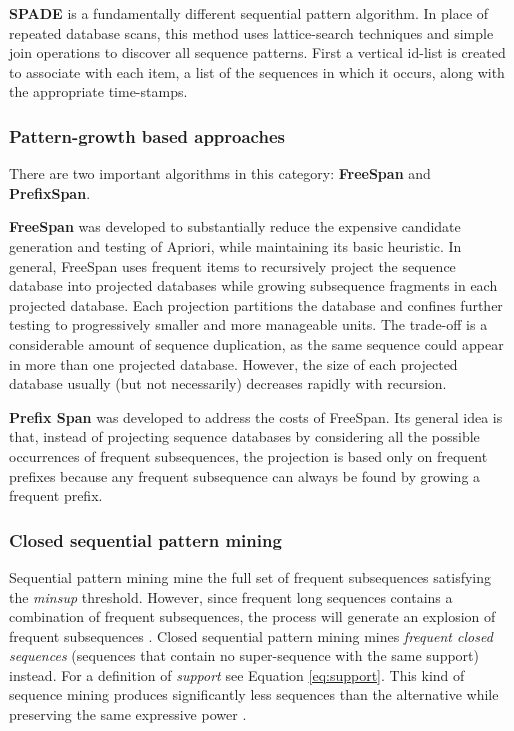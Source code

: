 \textbf{SPADE} \cite{zaki2001spade} is a fundamentally different sequential pattern algorithm. In place of repeated database scans, this method uses lattice-search techniques and simple join operations to discover all sequence patterns. First a vertical id-list is created to associate with each item, a list of the sequences in which it occurs, along with the appropriate time-stamps. 

\subsubsection*{Pattern-growth based approaches} 

There are two important algorithms in this category: \textbf{FreeSpan} and \textbf{PrefixSpan}.

\textbf{FreeSpan} \cite{han2000freespan} was developed to substantially reduce the expensive candidate generation and testing of Apriori, while maintaining its basic heuristic. In general, FreeSpan uses frequent items to recursively project the sequence database into projected databases while growing subsequence fragments in each projected database. Each projection partitions the database and confines further testing to progressively smaller and more manageable units. The trade-off is a considerable amount of sequence duplication, as the same sequence could appear in more than one projected database. However, the size of each projected database usually (but not necessarily) decreases rapidly with recursion. 

\textbf{Prefix Span} \cite{pei2004mining} was developed to address the costs of FreeSpan. Its general idea is that, instead of projecting sequence databases by considering all the possible occurrences of frequent subsequences, the projection is based only on frequent prefixes because any frequent subsequence can always be found by growing a frequent prefix. 

\subsubsection*{Closed sequential pattern mining}
Sequential pattern mining mine the full set of frequent subsequences satisfying the \textit{minsup} threshold. However, since frequent long sequences contains a combination of frequent subsequences, the process will generate an explosion of frequent subsequences \cite{yan2003clospan}. Closed sequential pattern mining mines \textit{frequent closed sequences} (sequences that contain no super-sequence with the same support) instead. For a definition of \textit{support} see Equation \ref{eq:support}. This kind of sequence mining produces significantly less sequences than the alternative while preserving the same expressive power \cite{yan2003clospan}.

